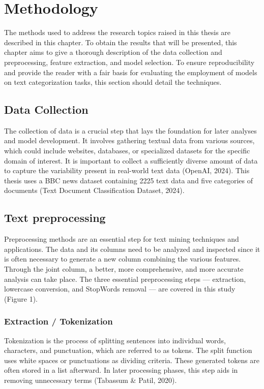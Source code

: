 \chapter{Methodology}

The methods used to address the research topics raised in this thesis are described in this chapter. To obtain the results that will be presented, this chapter aims to give a thorough description of the data collection and preprocessing, feature extraction, and model selection. To ensure reproducibility and provide the reader with a fair basis for evaluating the employment of models on text categorization tasks, this section should detail the techniques.

\section{Data Collection}

The collection of data is a crucial step that lays the foundation for later analyses and model development. It involves gathering textual data from various sources, which could include websites, databases, or specialized datasets for the specific domain of interest. It is important to collect a sufficiently diverse amount of data to capture the variability present in real-world text data (OpenAI, 2024). This thesis uses a BBC news dataset containing 2225 text data and five categories of documents (Text Document Classification Dataset, 2024). 

\section{Text preprocessing}

Preprocessing methods are an essential step for text mining techniques and applications. The data and its columns need to be analyzed and inspected since it is often necessary to generate a new column combining the various features. Through the joint column, a better, more comprehensive, and more accurate analysis can take place. The three essential preprocessing steps — extraction, lowercase conversion, and StopWords removal — are covered in this study (Figure 1).

\subsection{Extraction / Tokenization}

Tokenization is the process of splitting sentences into individual words, characters, and punctuation, which are referred to as tokens. The split function uses white spaces or punctuations as dividing criteria. These generated tokens are often stored in a list afterward. In later processing phases, this step aids in removing unnecessary terms (Tabassum \& Patil, 2020). 

